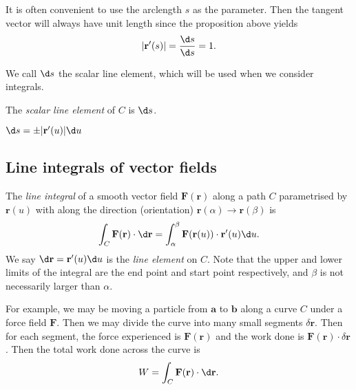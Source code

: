 \documentclass[a4paper]{article}
\begin{document}
It is often convenient to use the arclength $s$ as the parameter. Then the tangent vector will always have unit length since the proposition above yields
\[
  |\mathbf{r}'(s)| = \frac{\d s}{\d s} = 1.
\]

We call $\d s$ the scalar line element, which will be used when we consider integrals.
\begin{defi}
  The \emph{scalar line element} of $C$ is $\d s$.
\end{defi}

\begin{prop}
  $\d s = \pm |\mathbf{r}'(u)| \d u$
\end{prop}
\subsection{Line integrals of vector fields}
\begin{defi}
  The \emph{line integral} of a smooth vector field $\mathbf{F}(\mathbf{r})$ along a path $C$ parametrised by $\mathbf{r}(u)$ with along the direction (orientation) $ \mathbf{r}(\alpha)\to \mathbf{r}(\beta)$ is
  \[
    \int_C \mathbf{F}(\mathbf{r})\cdot \d \mathbf{r} = \int_\alpha^\beta \mathbf{F}(\mathbf{r}(u))\cdot \mathbf{r}'(u)\d u.
  \]
  We say $\d \mathbf{r} = \mathbf{r}'(u) \d u$ is the \emph{line element} on $C$. Note that the upper and lower limits of the integral are the end point and start point respectively, and $\beta$ is not necessarily larger than $\alpha$. 
\end{defi}
For example, we may be moving a particle from $\mathbf{a}$ to $\mathbf{b}$ along a curve $C$ under a force field $\mathbf{F}$. Then we may divide the curve into many small segments $\delta \mathbf{r}$. Then for each segment, the force experienced is $\mathbf{F}(\mathbf{r})$ and the work done is $\mathbf{F}(\mathbf{r})\cdot \delta\mathbf{r}$. Then the total work done across the curve is
\[
  W = \int_C \mathbf{F}(\mathbf{r})\cdot \d \mathbf{r}.
\]
\end{document}
